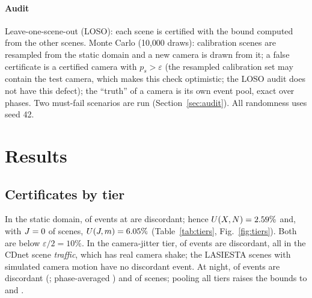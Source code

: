 \paragraph{Audit} Leave-one-scene-out (LOSO): each scene is certified with the bound computed from the other scenes.
Monte Carlo (10{,}000 draws): calibration scenes are resampled from the static domain and a new camera is drawn from it;
a false certificate is a certified camera with $p_s>\varepsilon$ (the resampled calibration set may contain the test
camera, which makes this check optimistic; the LOSO audit does not have this defect); the ``truth'' of a camera is its own event pool,
exact over phases. Two must-fail scenarios are run (Section~\ref{sec:audit}). All randomness uses seed 42.

\section{Results}\label{sec:results}

\subsection{Certificates by tier}
In the static domain, \nMainDw{} of \nMainN{} events at \OPs{} are discordant; hence $U(X,N)=2.59\%$ and,
with $J=0$ of \nMainM{} scenes, $U(J,m)=6.05\%$ (Table~\ref{tab:tiers}, Fig.~\ref{fig:tiers}). Both are
below $\varepsilon/2=10\%$. In the camera-jitter tier, \nJitDw{} of \nJitN{} events are discordant, all in the CDnet
scene \emph{traffic}, which has real camera shake; the LASIESTA scenes with simulated camera motion have no discordant
event. At
night, \nNightDw{} of \nNightN{} events are discordant (\nNightDwPct; phase-averaged \nNightDexp) and \nNightJ{} of
\nNightScenes{} scenes; pooling all tiers raises the bounds to \nAllUfleet{} and \nAllUpop.

